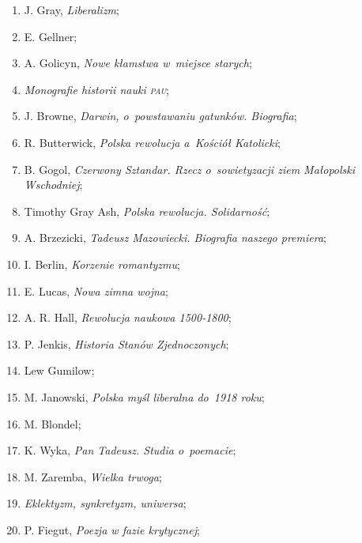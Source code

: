 \documentclass[a4paper,11pt]{article}
\begin{document}
\begin{enumerate}
\item J. Gray, \textit{Liberalizm};

\item E. Gellner;

\item A. Golicyn, \textit{Nowe kłamstwa w~miejsce starych};

\item \textit{Monografie historii nauki \textsc{pau}};

\item J. Browne, \textit{Darwin, o~powstawaniu gatunków. Biografia};

\item R. Butterwick, \textit{Polska rewolucja a~Kościół Katolicki};

\item B. Gogol, \textit{Czerwony Sztandar. Rzecz o~sowietyzacji ziem
    Małopolski Wschodniej};

\item Timothy Gray Ash, \textit{Polska rewolucja. Solidarność};

\item A. Brzezicki, \textit{Tadeusz Mazowiecki. Biografia naszego
    premiera};

\item I. Berlin, \textit{Korzenie romantyzmu};

\item E. Lucas, \textit{Nowa zimna wojna};

\item A. R. Hall, \textit{Rewolucja naukowa 1500-1800};

\item P. Jenkis, \textit{Historia Stanów Zjednoczonych};

\item Lew Gumilow;

\item M. Janowski, \textit{Polska myśl liberalna do~1918 roku};

\item M. Blondel;

\item K. Wyka, \textit{Pan Tadeusz. Studia o~poemacie};

\item M. Zaremba, \textit{Wielka trwoga};

\item \textit{Eklektyzm, synkretyzm, uniwersa};

\item P. Fiegut, \textit{Poezja w fazie krytycznej};


\end{enumerate}
\end{document}
